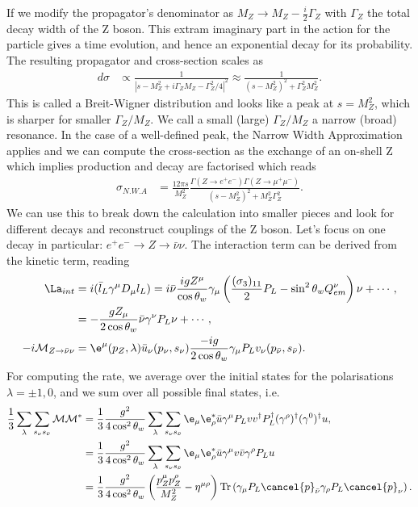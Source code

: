 \documentclass[relqm.tex]{subfiles}
\begin{document}
If we modify the propagator's denominator as $M_Z\to M_Z-\frac{i}{2}\Gamma_Z$ with $\Gamma_Z$ the total decay width of the Z boson. 
This extram imaginary part in the action for the particle gives a time evolution, and hence an exponential decay for its probability. 
The resulting propagator and cross-section scales as
\begin{align}
    d\sigma &\propto \frac{1}{|s-M_Z^2+i\Gamma_ZM_Z - \Gamma_Z^2/4|^2} \approx \frac{1}{(s-M_Z^2)^2+\Gamma_Z^2M_Z^2}.
\end{align}
This is called a Breit-Wigner distribution and looks like a peak at $s=M_Z^2$, which is sharper for smaller $\Gamma_Z/M_Z$. 
We call a small (large) $\Gamma_Z/M_Z$ a narrow (broad) resonance.
In the case of a well-defined peak, the Narrow Width Approximation applies and we can compute the cross-section as the exchange of an on-shell Z which implies production and decay are factorised which reads
\begin{align}
    \sigma_{N.W.A} &= \frac{12\pi s}{M_Z^2} \frac{\Gamma(Z\to e^+e^-)\Gamma(Z\to\mu^+\mu^-)}{(s-M_Z^2)^2+M_Z^2\Gamma_Z^2}.
\end{align}
We can use this to break down the calculation into smaller pieces and look for different decays and reconstruct couplings of the Z boson. 
Let's focus on one decay in particular: $e^+e^-\to Z\to\bar{\nu}\nu$.
The interaction term can be derived from the kinetic term, reading
\begin{align}
    \La_{int} &= i(\bar{l}_L\gamma^\mu D_\mu l_L) = i\bar{\nu}\frac{igZ^\mu}{\cos\theta_w}\gamma_\mu\left(\frac{(\sigma_3)_{11}}{2}P_L - \sin^2\theta_w Q_{em}^\nu\right)\nu + \cdots, \\
              &= -\frac{gZ_\mu}{2\cos\theta_w}\bar{\nu}\gamma^\nu P_L\nu + \cdots, \\
    -i\mathcal{M}_{Z\to\bar{\nu}\nu} &= \e^\mu(p_Z,\lambda)\bar{u}_\nu(p_\nu,s_\nu)\frac{-ig}{2\cos\theta_w}\gamma_\mu P_Lv_\nu(p_{\bar{\nu}},s_{\bar{\nu}}).
\end{align}
For computing the rate, we average over the initial states for the polarisations $\lambda=\pm1,0$, and we sum over all possible final states, i.e.
\begin{align}
    \frac13 \sum_{\lambda} \sum_{s_\nu s_{\bar{\nu}}} \mathcal{M}\mathcal{M}^* &= \frac13 \frac{g^2}{4\cos^2\theta_w} \sum_\lambda \sum_{s_\nu s_{\bar{\nu}}} \e_\mu\e_\rho^* \bar{u}\gamma^\mu P_L vv^\dagger P_L^\dagger (\gamma^\rho)^\dagger (\gamma^0)^\dagger u, \\
                                                                               &= \frac13 \frac{g^2}{4\cos^2\theta_w} \sum_\lambda \sum_{s_\nu s_{\bar{\nu}}} \e_\mu\e_\rho^* \bar{u}\gamma^\mu v\bar{v}\gamma^\rho P_L u \\
                                                                               &= \frac13 \frac{g^2}{4\cos^2\theta_w} \left(\frac{p^\mu_Z p^\rho_Z}{M_Z^2} - \eta^{\mu\rho}\right)\text{Tr}\left(\gamma_\mu P_L\cancel{p}_{\bar{\nu}}\gamma_\rho P_L\cancel{p}_\nu\right).
\end{align}
\end{document}
